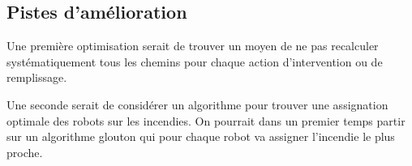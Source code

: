 \documentclass[a4paper,8pt]{article} %
\begin{document}
\subsection{Pistes d'amélioration}
Une première optimisation serait de trouver un moyen de ne pas recalculer systématiquement tous les chemins pour chaque action d'intervention ou de remplissage.

Une seconde serait de considérer un algorithme pour trouver une assignation optimale des robots sur les incendies. On pourrait dans un premier temps partir sur un algorithme glouton qui pour chaque robot va assigner l'incendie le plus proche.
\end{document}
